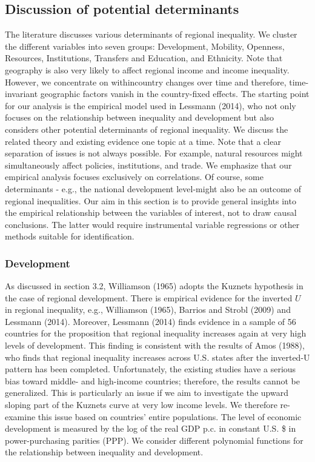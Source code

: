 \documentclass[10pt]{article}
\begin{document}
\subsection{Discussion of potential determinants}
The literature discusses various determinants of regional inequality. We cluster the different variables into seven groups: Development, Mobility, Openness, Resources, Institutions, Transfers and Education, and Ethnicity. Note that geography is also very likely to affect regional income and income inequality. However, we concentrate on withincountry changes over time and therefore, time-invariant geographic factors vanish in the country-fixed effects. The starting point for our analysis is the empirical model used in Lessmann (2014), who not only focuses on the relationship between inequality and development but also considers other potential determinants of regional inequality. We discuss the related theory and existing evidence one topic at a time. Note that a clear separation of issues is not always possible. For example, natural resources might simultaneously affect policies, institutions, and trade. We emphasize that our empirical analysis focuses exclusively on correlations. Of course, some determinants - e.g., the national development level-might also be an outcome of regional inequalities. Our aim in this section is to provide general insights into the empirical relationship between the variables of interest, not to draw causal conclusions. The latter would require instrumental variable regressions or other methods suitable for identification.

\subsubsection{Development}
As discussed in section 3.2, Williamson (1965) adopts the Kuznets hypothesis in the case of regional development. There is empirical evidence for the inverted $U$ in regional inequality, e.g., Williamson (1965), Barrios and Strobl (2009) and Lessmann (2014). Moreover, Lessmann (2014) finds evidence in a sample of 56 countries for the proposition that regional inequality increases again at very high levels of development. This finding is consistent with the results of Amos (1988), who finds that regional inequality increases across U.S. states after the inverted-U pattern has been completed. Unfortunately, the existing studies have a serious bias toward middle- and high-income countries; therefore, the results cannot be generalized. This is particularly an issue if we aim to investigate the upward sloping part of the Kuznets curve at very low income levels. We therefore re-examine this issue based on countries' entire populations. The level of economic development is measured by the log of the real GDP p.c. in constant U.S. \$ in power-purchasing parities (PPP). We consider different polynomial functions for the relationship between inequality and development.
\end{document}
